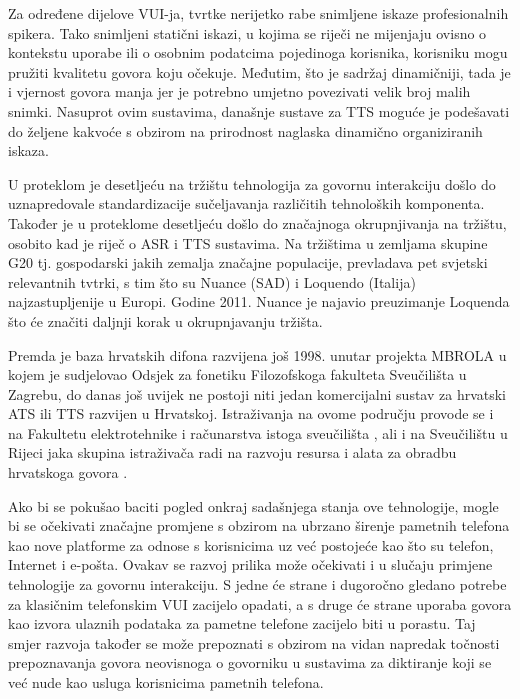 \begin{multicols}{2}
Za određene dijelove VUI-ja, tvrtke nerijetko rabe snimljene iskaze profesionalnih spikera. Tako snimljeni statični iskazi, u kojima se riječi ne mijenjaju ovisno o kontekstu uporabe ili o osobnim podatcima pojedinoga korisnika, korisniku mogu pružiti kvalitetu govora koju očekuje. Međutim, što je sadržaj dinamičniji, tada je i vjernost govora manja jer je potrebno umjetno povezivati velik broj malih snimki. Nasuprot ovim sustavima, današnje sustave za TTS moguće je podešavati do željene kakvoće s obzirom na prirodnost naglaska dinamično organiziranih iskaza.

U proteklom je desetljeću na tržištu tehnologija za govornu interakciju došlo do uznapredovale standardizacije sučeljavanja različitih tehnoloških komponenta. Također je u proteklome desetljeću došlo do značajnoga okrupnjivanja na tržištu, osobito kad je riječ o ASR i TTS sustavima. Na tržištima u zemljama skupine G20 tj. gospodarski jakih zemalja značajne populacije, prevladava pet svjetski relevantnih tvtrki, s tim što su Nuance (SAD) i Loquendo (Italija) najzastupljenije u Europi. Godine 2011. Nuance je najavio preuzimanje Loquenda što će značiti daljnji korak u okrupnjavanju tržišta.

Premda je baza hrvatskih difona razvijena još 1998. unutar projekta MBROLA \cite{str20} u kojem je sudjelovao Odsjek za fonetiku Filozofskoga fakulteta Sveučilišta u Zagrebu, do danas još uvijek ne postoji niti jedan komercijalni sustav za hrvatski ATS ili TTS razvijen u Hrvatskoj. Istraživanja na ovome području provode se i na Fakultetu elektrotehnike i računarstva istoga sveučilišta \cite{art1}, ali i na Sveučilištu u Rijeci jaka skupina istraživača radi na razvoju resursa i alata za obradbu hrvatskoga govora \cite{art2, str21, art3}.

Ako bi se pokušao baciti pogled onkraj sadašnjega stanja ove tehnologije, mogle bi se očekivati značajne promjene s obzirom na ubrzano širenje pametnih telefona kao nove platforme za odnose s korisnicima uz već postojeće kao što su telefon, Internet i e-pošta. Ovakav se razvoj prilika može očekivati i u slučaju primjene tehnologije za govornu interakciju. S jedne će strane i dugoročno gledano potrebe za klasičnim telefonskim VUI zacijelo opadati, a s druge će strane uporaba govora kao izvora ulaznih podataka za pametne telefone zacijelo biti u porastu. Taj smjer razvoja također se može prepoznati s obzirom na vidan napredak točnosti prepoznavanja govora neovisnoga o govorniku u sustavima za diktiranje koji se već nude kao usluga korisnicima pametnih telefona.


\end{multicols}
